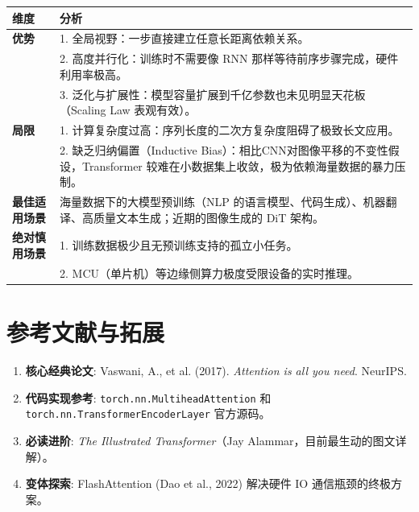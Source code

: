 \documentclass[12pt, a4paper]{article}
\begin{document}
\begin{table}[h]
\centering
\begin{tabular}{|p{}|p{}|}
\hline
\textbf{维度} & \textbf{分析} \\
\hline
\textbf{优势} & 1. 全局视野：一步直接建立任意长距离依赖关系。\\
& 2. 高度并行化：训练时不需要像 RNN 那样等待前序步骤完成，硬件利用率极高。\\
& 3. 泛化与扩展性：模型容量扩展到千亿参数也未见明显天花板（Scaling Law 表观有效）。\\
\hline
\textbf{局限} & 1. 计算复杂度过高：序列长度的二次方复杂度阻碍了极致长文应用。\\
& 2. 缺乏归纳偏置（Inductive Bias）：相比CNN对图像平移的不变性假设，Transformer 较难在小数据集上收敛，极为依赖海量数据的暴力压制。\\
\hline
\textbf{最佳适用场景} & 海量数据下的大模型预训练（NLP 的语言模型、代码生成）、机器翻译、高质量文本生成；近期的图像生成的 DiT 架构。\\
\hline
\textbf{绝对慎用场景} & 1. 训练数据极少且无预训练支持的孤立小任务。\\
& 2. MCU（单片机）等边缘侧算力极度受限设备的实时推理。\\
\hline
\end{tabular}
\end{table}

\section{参考文献与拓展}
\begin{enumerate}
    \item \textbf{核心经典论文}: Vaswani, A., et al. (2017). \textit{Attention is all you need}. NeurIPS. 
    \item \textbf{代码实现参考}: \texttt{torch.nn.MultiheadAttention} 和 \texttt{torch.nn.TransformerEncoderLayer} 官方源码。
    \item \textbf{必读进阶}: \textit{The Illustrated Transformer}（Jay Alammar，目前最生动的图文详解）。
    \item \textbf{变体探索}: FlashAttention (Dao et al., 2022) 解决硬件 IO 通信瓶颈的终极方案。
\end{enumerate}
\end{document}
